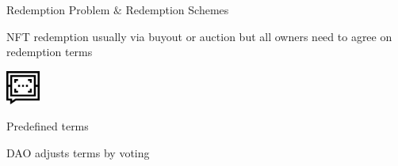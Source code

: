 \documentclass[handout]{beamer}
\begin{document}

\begin{frame}{Redemption Problem $\&$ Redemption Schemes}

\vspace{3em}
\hspace{1 em}		
		\begin{minipage}{0.9\textwidth}
		
			\begin{center}
				
NFT redemption usually via buyout or auction but all owners need to agree on redemption terms
				
			\end{center}
		\end{minipage}

		\pause
		\vspace{3 em}
		

		\begin{minipage}{0.2\textwidth}
			\begin{center}
				\includegraphics[height=3em]{../assets/images/predefined-answer.png}
			\end{center}
		\end{minipage}
		\hspace{1 em}
		\begin{minipage}{0.72\textwidth}
		Predefined terms
		\end{minipage}
		\pause
		\vspace{1 em}		
		
		
		\begin{minipage}{0.2\textwidth}
			\begin{center}
				\scalebox{0.75}{
					\begin{tikzpicture}
											
					\end{tikzpicture}
				}		
			\end{center}
		\end{minipage}
		\hspace{1 em}
		\begin{minipage}{0.72\textwidth}
		DAO adjusts terms by voting
		\end{minipage}
		\pause












\end{frame}
\end{document}
